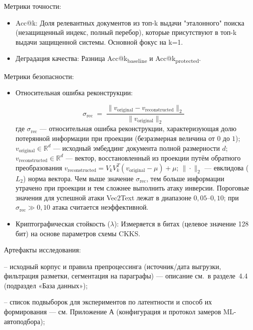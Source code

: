 \documentclass[a4paper, 12pt, oneside, openany]{article}
\begin{document}
		Метрики точности:

	
	\begin{itemize}
		\item
		Acc@k: Доля релевантных документов из топ-k выдачи "эталонного" поиска (незащищенный индекс, полный перебор), которые присутствуют в топ-k выдачи защищенной системы. Основной фокус на k=1.

		\item
		Деградация качества: Разница Acc@k\textsubscript{baseline} и Acc@k\textsubscript{protected}.
	\end{itemize}
	

		Метрики безопасности:
	
	
	\begin{itemize}
		\item
		Относительная ошибка реконструкции:


\begin{equation}
	\sigma_{\mathrm{rec}} \;=\; \frac{\| v_{\mathrm{original}} - v_{\mathrm{reconstructed}} \|_{2}}{\| v_{\mathrm{original}} \|_{2}}
	\label{eq:4-11}
\end{equation}
где $\sigma_{\mathrm{rec}}$ --- относительная ошибка реконструкции, характеризующая долю потерянной информации при проекции (безразмерная величина от $0$ до $1$); $v_{\mathrm{original}} \in \mathbb{R}^{d}$ --- исходный эмбеддинг документа полной размерности $d$; $v_{\mathrm{reconstructed}} \in \mathbb{R}^{d}$ --- вектор, восстановленный из проекции путём обратного преобразования $v_{\mathrm{reconstructed}} = V_{k} V_{k}^{T}(v_{\mathrm{original}} - \mu) + \mu$; $\|\cdot\|_{2}$ --- евклидова ($L_{2}$) норма вектора. Чем выше значение $\sigma_{\mathrm{rec}}$, тем больше информации утрачено при проекции и тем сложнее выполнить атаку инверсии. Пороговые значения для успешной атаки Vec2Text лежат в диапазоне $0{,}05$--$0{,}10$; при $\sigma_{\mathrm{rec}} \gg 0{,}10$ атака считается неэффективной.


	\item
	Криптографическая стойкость ($\lambda$): Измеряется в битах (целевое значение 128 бит) на основе параметров схемы CKKS.
\end{itemize}

Артефакты исследования:

-- исходный корпус и правила препроцессинга (источник/дата выгрузки, фильтрация разметки, сегментация на параграфы) --- описание см.\ в разделе~4.4 (подраздел «База данных»);

-- список подвыборок для экспериментов по латентности и способ их формирования --- см. Приложение А (конфигурация и протокол замеров ML-автоподбора);
\end{document}
